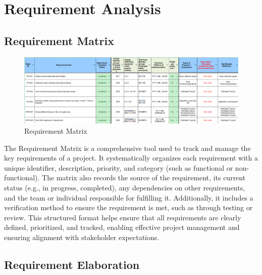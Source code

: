 \pagebreak

\section{Requirement Analysis}

\subsection{Requirement Matrix}
\begin{figure}[h!]  
    \centering
    \includegraphics[width=1.0\textwidth]{Images/Requirement Matrix.png}  
    \caption{Requirement Matrix}
    \label{Requirement Matrix}  %
\end{figure}

\noindent
The Requirement Matrix is a comprehensive tool used to track and manage the key requirements of a project. It systematically organizes each requirement with a unique identifier, description, priority, and category (such as functional or non-functional). The matrix also records the source of the requirement, its current status (e.g., in progress, completed), any dependencies on other requirements, and the team or individual responsible for fulfilling it. Additionally, it includes a verification method to ensure the requirement is met, such as through testing or review. This structured format helps ensure that all requirements are clearly defined, prioritized, and tracked, enabling effective project management and ensuring alignment with stakeholder expectations.

\subsection{Requirement Elaboration}

